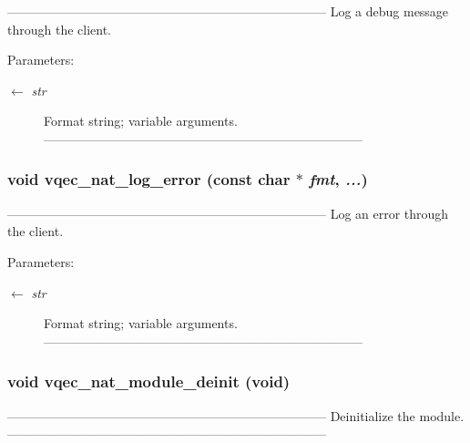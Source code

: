 --------------------------------------------------------------------------- Log a debug message through the client.

\begin{Desc}
\item[Parameters:]
\begin{description}
\item[\mbox{$\leftarrow$} {\em str}]Format string; variable arguments. --------------------------------------------------------------------------- \end{description}
\end{Desc}
\subsubsection{\setlength{\rightskip}{0pt plus 5cm}void vqec\_\-nat\_\-log\_\-error (const char $\ast$ {\em fmt},  {\em ...})}\label{vqec__nat__api_8c_63f19664be82f295bbb41d506779c9c7}


--------------------------------------------------------------------------- Log an error through the client.

\begin{Desc}
\item[Parameters:]
\begin{description}
\item[\mbox{$\leftarrow$} {\em str}]Format string; variable arguments. --------------------------------------------------------------------------- \end{description}
\end{Desc}
\subsubsection{\setlength{\rightskip}{0pt plus 5cm}void vqec\_\-nat\_\-module\_\-deinit (void)}\label{vqec__nat__api_8c_a36b72241b333e6268eb9c0bc3761449}


--------------------------------------------------------------------------- Deinitialize the module. --------------------------------------------------------------------------- 
